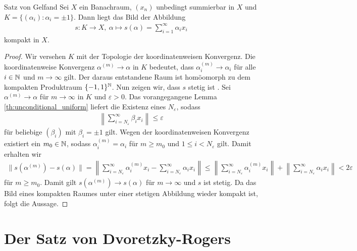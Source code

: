 \begin{genericthm}{Satz von Gelfand}\label{th:gelfand}
	Sei $ X $ ein Banachraum, $ (x_n) $ unbedingt summierbar in $ X $
	und $ K = \{ (\alpha_i)  :  \alpha_i = \pm 1 \} $.
	Dann liegt das Bild der Abbildung
	\begin{align*}
		s : K \to X, \ 
		\alpha \mapsto s(\alpha) =
		\sum \limits_{i = 1}^\infty \alpha_i x_i 
	\end{align*}
	kompakt in $ X $.
\end{genericthm}

\begin{proof}
	Wir versehen $ K $ mit der Topologie der koordinatenweisen Konvergenz.
	Die koordinatenweise Konvergenz $ \alpha^{(m)} \to  \alpha$ in $ K $ bedeutet, dass $ \alpha_i^{(m)} \to \alpha_i $
	für alle $ i \in \mathbb{N} $ und $ m \to \infty $ gilt.
	Der daraus entstandene Raum ist homöomorph zu dem kompakten Produktraum $  \{-1,1\}^{\mathbb{N}} $.
	Nun zeigen wir, dass $ s $ stetig ist .
	Sei $ \alpha^{(m)} \to \alpha $ für $ m \to \infty $ in $ K $ und $ \varepsilon > 0 $.
	Das vorangegangene Lemma \ref{th:unconditional_uniform} liefert die Existenz eines $ N_\varepsilon $, sodass
	\begin{align*}
		\left\| \sum \limits_{i = N_\varepsilon}^{\infty} \beta_i x_i \right\|
		\leq \varepsilon
	\end{align*}
	für beliebige $ (\beta_i) $ mit $ \beta_i = \pm 1 $ gilt. 
	Wegen der koordinatenweisen Konvergenz existiert ein $ m_0 \in \mathbb{N} $, sodass
	$ \alpha_i^{(m)} = \alpha_i $ für $ m\geq m_0 $ und $ 1 \leq i < N_\varepsilon $
	gilt. Damit erhalten wir
	\begin{align*}
		\| s(\alpha^{(m)}) - s(\alpha) \|
		=
		\left\|
		\sum \limits_{i = N_\varepsilon}^{\infty} \alpha^{(m)}_i x_i
		-
		\sum \limits_{i = N_\varepsilon}^{\infty} \alpha_i x_i
		\right\|
		\leq
		\left\|
		\sum \limits_{i = N_\varepsilon}^{\infty} \alpha^{(m)}_i x_i
		\right\|
		+\left\|
		\sum \limits_{i = N_\varepsilon}^{\infty} \alpha_i x_i
		\right\|
		< 2 \varepsilon
	\end{align*}
	für $ m \geq m_0 $.
	Damit gilt $s(\alpha^{(m)}) \to s(\alpha)  $ für $ m \to \infty $ und $ s $ ist stetig.
	Da das Bild eines kompakten Raumes unter einer stetigen Abbildung wieder kompakt ist, folgt die Aussage.
	
\end{proof}


\section{Der Satz von Dvoretzky-Rogers}\label{sc:dv_rg}

